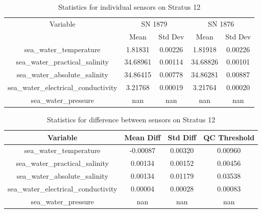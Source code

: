\begin{table}[h]
\centering
\begin{tabular}{|c|c|c|c|c|}
\hline
Variable & \multicolumn{2}{c|}{SN 1879} & \multicolumn{2}{c|}{SN 1876} \\
& Mean & Std Dev & Mean & Std Dev \\
\hline
sea\_water\_temperature & 1.81831 & 0.00226 & 1.81918 & 0.00226 \\
sea\_water\_practical\_salinity & 34.68961 & 0.00114 & 34.68826 & 0.00101 \\
sea\_water\_absolute\_salinity & 34.86415 & 0.00778 & 34.86281 & 0.00887 \\
sea\_water\_electrical\_conductivity & 3.21768 & 0.00019 & 3.21764 & 0.00020 \\
sea\_water\_pressure & nan & nan & nan & nan \\
\hline
\end{tabular}
\caption{Statistics for individual sensors on Stratus 12}
\end{table}

\begin{table}[h]
\centering
\begin{tabular}{|c|c|c|c|}
\hline
Variable & Mean Diff & Std Diff & QC Threshold \\
\hline
sea\_water\_temperature & -0.00087 & 0.00320 & 0.00960 \\
sea\_water\_practical\_salinity & 0.00134 & 0.00152 & 0.00456 \\
sea\_water\_absolute\_salinity & 0.00134 & 0.01179 & 0.03538 \\
sea\_water\_electrical\_conductivity & 0.00004 & 0.00028 & 0.00083 \\
sea\_water\_pressure & nan & nan & nan \\
\hline
\end{tabular}
\caption{Statistics for difference between sensors on Stratus 12}
\end{table}
